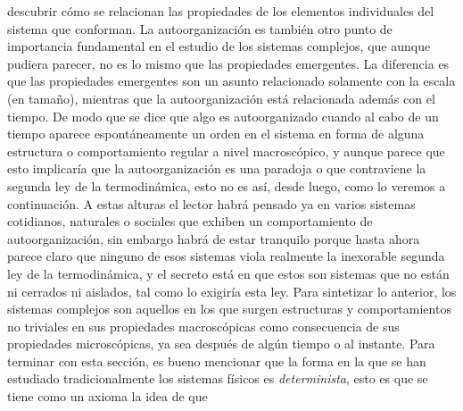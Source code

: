 descubrir cómo se relacionan las propiedades de los elementos individuales del sistema que conforman. La autoorganización es también otro punto de importancia fundamental en el estudio de los sistemas complejos, que aunque pudiera parecer, no es lo mismo que las propiedades emergentes. La diferencia es que las propiedades emergentes son un asunto relacionado solamente con la escala (en tamaño), mientras que la autoorganización está relacionada además con el tiempo. De modo que se dice que algo es autoorganizado cuando al cabo de un tiempo  aparece espontáneamente un orden en el sistema en forma de alguna estructura o comportamiento regular a nivel macroscópico, y aunque parece que esto implicaría que la autoorganización es una paradoja o que contraviene la segunda ley de la termodinámica, esto no es así, desde luego, como lo veremos a continuación. A estas alturas el lector habrá pensado ya en varios sistemas cotidianos, naturales o sociales que exhiben un comportamiento de autoorganización, sin embargo habrá de estar tranquilo porque hasta ahora parece claro que ninguno de esos sistemas viola realmente la inexorable segunda ley de la termodinámica, y el secreto está en que estos son sistemas que no están ni cerrados ni aislados, tal como lo exigiría esta ley.
Para sintetizar lo anterior, los sistemas complejos son aquellos en los que surgen estructuras y comportamientos no triviales en sus propiedades macroscópicas como consecuencia de sus propiedades microscópicas, ya sea después de algún tiempo o al instante.
Para terminar con esta sección, es bueno mencionar que la forma en la que se han estudiado tradicionalmente los sistemas físicos es \textit{determinista}, esto es que se tiene como un axioma la idea de que


